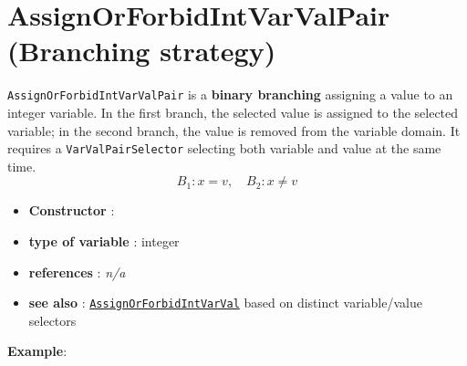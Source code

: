 \section{AssignOrForbidIntVarValPair (Branching strategy)}\label{assignorforbidintvarvalpair:assignorforbidintvarvalpairbranchstrat}\hypertarget{assignorforbidintvarvalpair:assignorforbidintvarvalpairbranchstrat}{}
\begin{notedef}
\texttt{AssignOrForbidIntVarValPair} is a  \textbf{binary branching} assigning a value to an integer variable. In the first branch, the selected value is assigned to the selected variable; in the second branch, the value is removed from the variable domain.
It requires a \texttt{VarValPairSelector} selecting both variable and value at the same time.
$$B_1: x=v,\quad B_2: x\neq v$$
\end{notedef}


\begin{itemize}
	\item \textbf{Constructor} :
	\item \textbf{type of variable} : integer
	\item \textbf{references} : \emph{n/a}
	\item \textbf{see also} : \hyperlink{assignorforbidintvarval:assignorforbidintvarvalbranchstrat}{\texttt{AssignOrForbidIntVarVal}} based on distinct variable/value selectors
\end{itemize}

\textbf{Example}:
%


